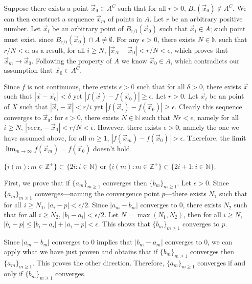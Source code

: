 \documentclass{homework}
\begin{document}
\begin{problem}{5}
Suppose there exists a point $\vec{x}_0 \in A^C$ such that for all $r > 0$, $B_r(\vec{x}_0) \notin A^C$. We can then construct a sequence $\vec{x}_m$ of points in $A$. Let $r$ be an arbitrary positive number. Let $\vec{x}_i$ be an arbitrary point of $B_{r/i}(\vec{x}_0)$ such that $\vec{x}_i \in A$; such point must exist, since $B_{r/i}(\vec{x}_0) \cap A \neq \emptyset$. For any $\epsilon > 0$, there exists $N \in \mathbb{N}$ such that $r/N < \epsilon$; as a result, for all $i \geq N$, $|\vec{x}_N - \vec{x}_0| < r/N < \epsilon$, which proves that $\vec{x}_m \to \vec{x}_0$. Following the property of $A$ we know $\vec{x}_0 \in A$, which contradicts our assumption that $\vec{x}_0 \in A^C$. \QED
\end{problem}

\begin{problem}{6}
Since $f$ is not continuous, there exists $\epsilon > 0$ such that for all $\delta > 0$, there exists $\vec{x}$ such that $|\vec{x} - \vec{x}_0| < \delta$ yet $|f(\vec{x}) - f(\vec{x}_0)| \geq \epsilon$. Let $r > 0$. Let $\vec{x}_i$ be an point of $X$ such that $|\vec{x}_i - \vec{x}| < r/i$ yet $|f(\vec{x}_i) - f(\vec{x}_0)| \geq \epsilon$. Clearly this sequence converges to $\vec{x}_0$: for $\epsilon > 0$, there exists $N \in \mathbb{N}$ such that $Nr < \epsilon$, namely for all $i \geq N$, $|vec{x}_i - \vec{x}_0| < r/N < \epsilon$. However, there exists $\epsilon > 0$, namely the one we have assumed above, for all $m \geq 1$, $|f(\vec{x}_m) - f(\vec{x}_0)| > \epsilon$. Therefore, the limit $\lim_{m \to \infty}f(\vec{x}_m) = f(\vec{x}_0)$ doesn't hold. \QED
\end{problem}

\begin{problem}{7}
$\{i(m) : m \in \mathbb{Z}^{+}\} \subset \{2i : i \in \mathbb{N}\}$ or $\{i(m) : m \in \mathbb{Z}^{+}\} \subset \{2i + 1 : i \in \mathbb{N}\}$.
\end{problem}

\begin{problem}{9}
First, we prove that if $\{a_m\}_{m\geq1}$ converges then $\{b_m\}_{m\geq1}$. Let $\epsilon > 0$. Since $\{a_m\}_{m\geq1}$ converges---naming the convergence point $p$---there exists $N_1$ such that for all $i \geq N_1$, $|a_i - p| < \epsilon / 2$. Since $|a_m - b_m|$ converges to $0$, there exists $N_2$ such that for all $i \geq N_2$, $|b_i - a_i| < \epsilon / 2$. Let $N = \max(N_1, N_2)$, then for all $i \geq N$, $|b_i - p| \leq |b_i - a_i| + |a_i - p| < \epsilon$. This shows that $\{b_m\}_{m\geq1}$ converges to $p$.

Since $|a_m - b_m|$ converges to $0$ implies that $|b_m - a_m|$ converges to $0$, we can apply what we have just proven and obtains that if $\{b_m\}_{m\geq1}$ converges then $\{a_m\}_{m\geq1}$. This proves the other direction. Therefore, $\{a_m\}_{m\geq1}$ converges if and only if $\{b_m\}_{m\geq1}$ converges. \QED
\end{problem}
\end{document}
